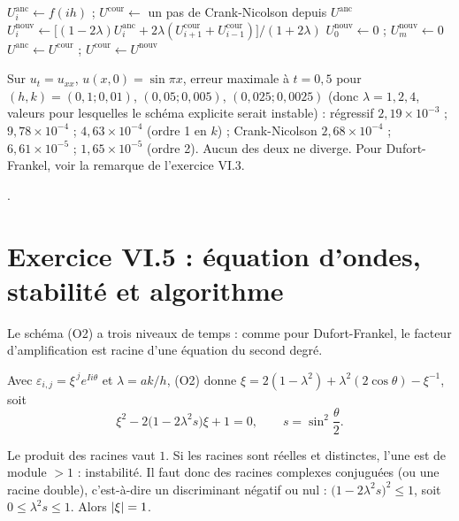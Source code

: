 \begin{algo}
  \State $U^{\text{anc}}_i \leftarrow f(ih)$ ; $U^{\text{cour}} \leftarrow$ un pas de Crank-Nicolson depuis $U^{\text{anc}}$
      \State $U^{\text{nouv}}_i \leftarrow \bigl[(1 - 2\lambda)U^{\text{anc}}_i
         + 2\lambda(U^{\text{cour}}_{i+1} + U^{\text{cour}}_{i-1})\bigr]/(1 + 2\lambda)$
    \EndFor
    \State $U^{\text{nouv}}_0 \leftarrow 0$ ; $U^{\text{nouv}}_m \leftarrow 0$
    \State $U^{\text{anc}} \leftarrow U^{\text{cour}}$ ; $U^{\text{cour}} \leftarrow U^{\text{nouv}}$
  \EndFor
\end{algo}

\Verif Sur $u_t = u_{xx}$, $u(x,0) = \sin\pi x$, erreur maximale à $t = 0{,}5$
pour $(h, k) = (0{,}1 ; 0{,}01)$, $(0{,}05 ; 0{,}005)$, $(0{,}025 ; 0{,}0025)$
(donc $\lambda = 1, 2, 4$, valeurs pour lesquelles le schéma explicite serait
instable) : régressif $2{,}19\times 10^{-3}$ ; $9{,}78\times 10^{-4}$ ;
$4{,}63\times 10^{-4}$ (ordre 1 en $k$) ; Crank-Nicolson $2{,}68\times 10^{-4}$ ;
$6{,}61\times 10^{-5}$ ; $1{,}65\times 10^{-5}$ (ordre 2). Aucun des deux ne
diverge. Pour Dufort-Frankel, voir la remarque de l'exercice VI.3.

\Refs {}.

\section{Exercice VI.5 : équation d'ondes, stabilité et algorithme}


\Pourquoi Le schéma (O2) a trois niveaux de temps : comme pour Dufort-Frankel,
le facteur d'amplification est racine d'une équation du second degré.

 Avec $\varepsilon_{i,j} = \xi^{\,j}e^{Ii\theta}$ et $\lambda = ak/h$,
(O2) donne
$\xi = 2(1 - \lambda^2) + \lambda^2(2\cos\theta) - \xi^{-1}$, soit
\[
  \xi^2 - 2\bigl(1 - 2\lambda^2s\bigr)\xi + 1 = 0, \qquad s = \sin^2\frac\theta2 .
\]

 Le produit des racines vaut $1$. Si les racines sont réelles et
distinctes, l'une est de module $> 1$ : instabilité. Il faut donc des racines
complexes conjuguées (ou une racine double), c'est-à-dire un discriminant
négatif ou nul : $\bigl(1 - 2\lambda^2s\bigr)^2 \le 1$, soit
$0 \le \lambda^2s \le 1$. Alors $\left|\xi\right| = 1$.

